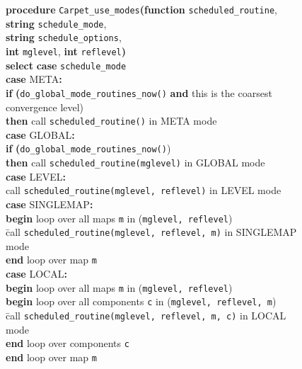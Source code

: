 \documentclass{article}
\begin{document}
\begin{figure}
\def\B#1{\textbf{#1}}
\def\tab{\phantom{\texttt{~~~~~~~~}}}
\begin{tabbing}
\B{procedure} \verb|Carpet_use_modes|\B{(}\=%
        \B{function} \verb|scheduled_routine|,				\\
        \>\B{string} \verb|schedule_mode|,				\\
        \>\B{string} \verb|schedule_options|,				\\
        \>\B{int} \texttt{mglevel},
        \B{int} \texttt{reflevel}\B{)}					\\
\B{select} \B{case} \verb|schedule_mode|				\\
\B{case} META\B{:}							\\
\tab    \=\B{if} \=\B{(}\verb|do_global_mode_routines_now()|
                        \textbf{and} this is the coarsest convergence level)
									\\
        \>        \>\B{then}
                        call \verb|scheduled_routine()| in META mode	\\
\B{case} GLOBAL\B{:}							\\
\tab    \=\B{if} \=\B{(}\verb|do_global_mode_routines_now()|)		\\
        \>       \>\B{then}
			call \verb|scheduled_routine(mglevel)|
			in GLOBAL mode					\\
\B{case} LEVEL\B{:}							\\
	\>call \verb|scheduled_routine(mglevel, reflevel)|
	in LEVEL mode							\\
\B{case} SINGLEMAP\B{:}							\\
	\>\B{begin} loop over all maps \verb|m|
		  in (\verb|mglevel, reflevel|)				\\
	\>\tab	\=call \verb|scheduled_routine(mglevel, reflevel, m)|
		  in SINGLEMAP mode					\\
	\>\B{end} loop over map \verb|m|			\\
\B{case} LOCAL\B{:}							\\
	\>\B{begin} loop over all maps \verb|m|
		  in (\verb|mglevel, reflevel|)				\\
	\>\tab	\=\B{begin} loop over all components \verb|c|
			  in (\verb|mglevel, reflevel, m|)		\\
	\>	\>\tab	\=call
			  \verb|scheduled_routine(mglevel, reflevel, m, c)|
			  in LOCAL mode					\\
	\>	\>\B{end} loop over components \verb|c|	\\
	\>\B{end} loop over map \verb|m|			\\

\end{tabbing}
\end{figure}
\end{document}
